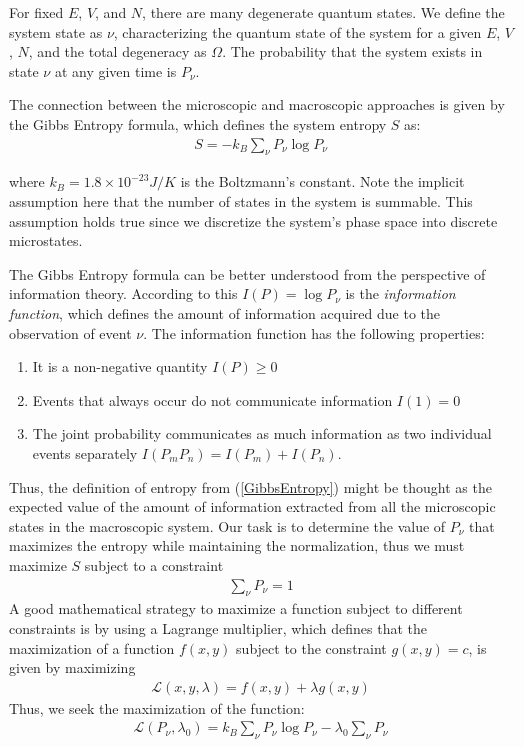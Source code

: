 \documentclass[book.tex]{subfiles}
\begin{document}
For fixed $E$, $V$, and $N$, there are many degenerate quantum states. We define the system state as $\nu$, characterizing the quantum state of the system for a given $E$, $V$, $N$, and the total degeneracy as $\Omega$. The probability that the system exists in state $\nu$ at any given time is $P_\nu$.



The connection between the microscopic and macroscopic approaches is given by the Gibbs Entropy formula, which defines the system entropy $S$ as:
\begin{align}\label{GibbsEntropy}
S = - k_B \sum_\nu P_\nu \log P_\nu
\end{align}

\noindent where $k_B = 1.8\times10^{-23} J/K$ is the Boltzmann's constant. Note the implicit assumption here that the number of states in the system is summable. This assumption holds true since we discretize the system's phase space into discrete microstates.

The Gibbs Entropy formula can be better understood from the perspective of information theory. According to this $I(P) = \log P_\nu$ is the \textit{information function}, which defines the amount of information acquired due to the observation of event $\nu$. The information function has the following properties:
\begin{enumerate}
\item It is a non-negative quantity $I(P) \ge 0$
\item Events that always occur do not communicate information
 $I(1) = 0$ 
\item The joint probability communicates as much information as two individual events separately $I(P_m P_n) = I(P_m) + I(P_n)$.
\end{enumerate}
Thus, the definition of entropy from (\ref{GibbsEntropy}) might be thought as the expected value of the amount of information extracted from all the microscopic states in the macroscopic system.
Our task is to determine the value of $P_\nu$ that maximizes the entropy while maintaining the normalization, thus we must maximize $S$ subject to a constraint 
\begin{align}\sum_\nu P_\nu = 1\end{align} 
A good mathematical strategy to maximize a function subject to different constraints is by using a Lagrange multiplier, which defines that the maximization of a function $f(x,y)$ subject to the constraint $g(x,y) = c$, is given by maximizing 
\begin{align}
\mathcal{L} (x,y,\lambda) = f(x,y) + \lambda g(x,y)
\end{align}
Thus, we seek the maximization of the function:
\begin{align}
\mathcal{L}(P_\nu,\lambda_0) = k_B\sum_\nu P_\nu \log P_\nu - \lambda_0\sum_\nu P_\nu 
\end{align}
\end{document}
